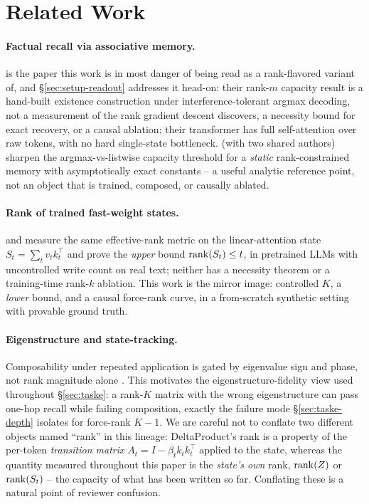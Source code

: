\section{Related Work}
\label{sec:related}

\paragraph{Factual recall via associative memory.}
\citet{nichani2025factual} is the paper this work is in most danger of
being read as a rank-flavored variant of, and \S\ref{sec:setup-readout}
addresses it head-on: their rank-$m$ capacity result is a hand-built
existence construction under interference-tolerant argmax decoding, not a
measurement of the rank gradient descent discovers, a necessity bound for
exact recovery, or a causal ablation; their transformer has full
self-attention over raw tokens, with no hard single-state bottleneck.
\citet{barnfield2026sharp} (with two shared authors) sharpen the
argmax-vs-listwise capacity threshold for a \emph{static} rank-constrained
memory with asymptotically exact constants -- a useful analytic reference
point, not an object that is trained, composed, or causally ablated.

\paragraph{Rank of trained fast-weight states.}
\citet{nazari2026rank} and \citet{sun2026staterank} measure the same
effective-rank metric on the linear-attention state $S_t=\sum_tv_tk_t^\top$
and prove the \emph{upper} bound $\operatorname{rank}(S_t)\leq t$, in pretrained LLMs
with uncontrolled write count on real text; neither has a necessity theorem
or a training-time rank-$k$ ablation. This work is the mirror image:
controlled $K$, a \emph{lower} bound, and a causal force-rank curve, in a
from-scratch synthetic setting with provable ground truth.

\paragraph{Eigenstructure and state-tracking.} Composability under
repeated application is gated by eigenvalue sign and phase, not rank
magnitude alone \citep{grazzi2025negative,siems2025deltaproduct}. This
motivates the eigenstructure-fidelity view used throughout
\S\ref{sec:taske}: a rank-$K$ matrix with the wrong eigenstructure can pass
one-hop recall while failing composition, exactly the failure mode
\S\ref{sec:taske-depth} isolates for force-rank $K{-}1$. We are careful not
to conflate two different objects named ``rank'' in this lineage:
DeltaProduct's rank is a property of the per-token \emph{transition
matrix} $A_t=I-\beta_tk_tk_t^\top$ applied to the state, whereas the
quantity measured throughout this paper is the \emph{state's own} rank,
$\operatorname{rank}(Z)$ or $\operatorname{rank}(S_t)$ -- the capacity of what has been written so far.
Conflating these is a natural point of reviewer confusion.

